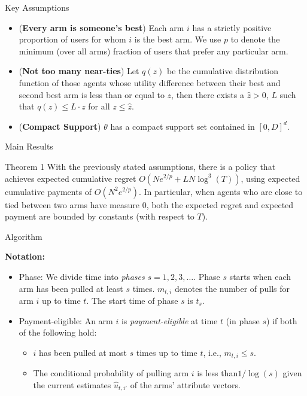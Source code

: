 \documentclass[final]{beamer} %
\begin{document}
\begin{frame}[t]
\begin{columns}[t]
\begin{column}{0.28\paperwidth}

\begin{block}{Key Assumptions}
\begin{itemize}[label=\textbullet]
\item (\textbf{Every arm is someone's best}) Each arm $i$ has a strictly positive proportion of users for whom $i$ is the best arm. We use $p$ to denote the minimum (over all arms) fraction of users that prefer any particular arm.
\item (\textbf{Not too many near-ties}) Let $q(z)$ be the cumulative distribution function of those agents whose utility difference between their best and second best arm is less than or equal to $z$, then there exists a $\hat{z}>0$, $L$ such that $q(z)\leq L\cdot z$ for all $z\leq \hat{z}$.
\item (\textbf{Compact Support}) $\theta$ has a compact support set contained in $[0,D]^{d}$.
\end{itemize}
\end{block}

\begin{block}{Main Results}
\begin{alertblock}{Theorem 1}
With the previously stated assumptions, there is a policy that achieves expected 
cumulative regret $O (N e^{2/p} + L N \log^3(T))$,
using expected cumulative payments of $O(N^2 e^{2/p})$.
\newline
\newline
In particular, when agents who are close to tied between two arms have measure $0$,
both the expected regret and expected payment are bounded by constants
(with respect to $T$). 
\end{alertblock}
\end{block}							

\begin{block}{Algorithm}


\textbf{Notation:}
\vspace{0.5cm}
\begin{itemize}[label=\textbullet]
\item Phase: We divide time into \emph{phases} $s = 1, 2, 3, \ldots$. Phase $s$ starts when each arm has been pulled at least $s$ times. $m_{t,i}$ denotes the number of pulls for arm $i$ up to time $t$. The start time of phase $s$ is $t_s$. 
\item Payment-eligible: An arm $i$ is \emph{payment-eligible} at time $t$ (in phase $s$) if both of the following hold:
\begin{itemize}[label=\textbullet]
\item $i$ has been pulled at most $s$ times up to time $t$, i.e., $m_{t,i} \leq s$.
\item  The conditional probability of pulling arm $i$ is less than$1/\log(s)$ given the current estimates $\hat{u}_{t,i'}$ of the arms' attribute vectors.  
\end{itemize}
\end{itemize}



\end{block}
\end{column}
\end{columns}
\end{frame}
\end{document}
